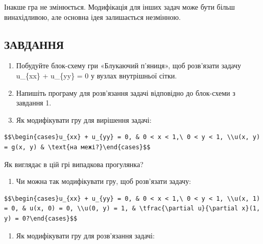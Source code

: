 \documentclass[
  ukrainian,
]{article}
\providecommand{\tightlist}{%
  \setlength{\itemsep}{0pt}\setlength{\parskip}{0pt}}
\begin{document}
Інакше гра не змінюється. Модифікація для інших задач може бути більш
винахідливою, але основна ідея залишається незмінною.

\subsection{ЗАВДАННЯ}\label{ux437ux430ux432ux434ux430ux43dux43dux44f-23}

\begin{enumerate}
\def\labelenumi{\arabic{enumi}.}
\item
  Побудуйте блок-схему гри «Блукаючий п'яниця», щоб розв'язати задачу
  u\_\{xx\} + u\_\{yy\} = 0 у вузлах внутрішньої сітки.
\item
  Напишіть програму для розв'язання задачі відповідно до блок-схеми з
  завдання 1.
\item
  Як модифікувати гру для вирішення задачі:
\end{enumerate}

\begin{verbatim}
$$\begin{cases}u_{xx} + u_{yy} = 0, & 0 < x < 1,\ 0 < y < 1, \\u(x, y) = g(x, y) & \text{на межі?}\end{cases}$$
\end{verbatim}

Як виглядає в цій грі випадкова прогулянка?

\begin{enumerate}
\def\labelenumi{\arabic{enumi}.}
\setcounter{enumi}{3}
\tightlist
\item
  Чи можна так модифікувати гру, щоб розв'язати задачу:
\end{enumerate}

\begin{verbatim}
$$\begin{cases}u_{xx} + u_{yy} = 0, & 0 < x < 1,\ 0 < y < 1, \\u(x, 1) = 0, & u(x, 0) = 0, \\u(0, y) = 1, & \tfrac{\partial u}{\partial x}(1, y) = 0?\end{cases}$$
\end{verbatim}

\begin{enumerate}
\def\labelenumi{\arabic{enumi}.}
\setcounter{enumi}{4}
\tightlist
\item
  Як модифікувати гру для розв'язання задачі:
\end{enumerate}
\end{document}
